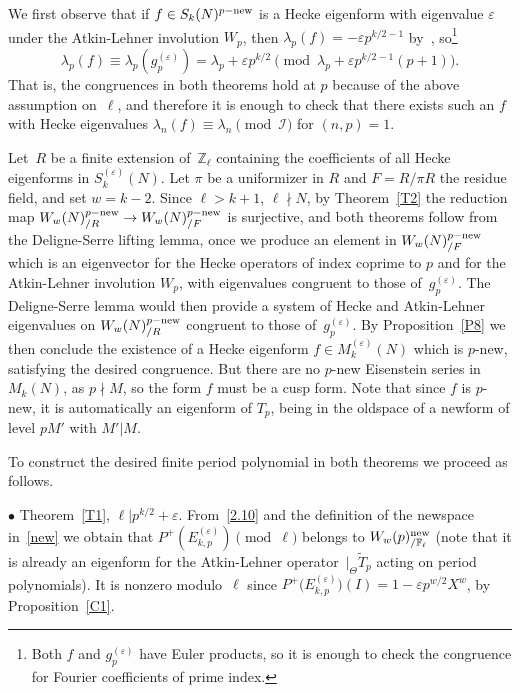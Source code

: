 \documentclass{amsart}
\theoremstyle{plain}
\theoremstyle{definition}
\numberwithin{equation}{section}
\newcommand{\Z}{{\mathbb Z}}
\def\I{\mathcal{I}} \def\J{\mathcal{J}} \def\LL{\mathcal{L}}
\def\e{\varepsilon} \def\DD{\Delta} \def\G{\Gamma}\def\om{\omega}
\newcommand{\wT}{\widetilde{T}}
\def\rar{\rightarrow}\def\FF{\mathbb{F}}
\begin{document}
We first observe that if $f\in S_k(N)^{p-\mathrm{new}}$ is a Hecke eigenform with 
 eigenvalue $\e$ under the Atkin-Lehner involution $W_p$, then $\lambda_{p}(f)=-\e p^{k/2-1}$ by~\cite[Thm. 3]{AL}, 
so\footnote{Both  $f$ and  $g_p^{(\e)}$  have Euler products,  so it is enough to check
the congruence for Fourier coefficients of prime index.}
 \[\lambda_{p}(f)\equiv \lambda_{p}(g_p^{(\e)})=\lambda_{p}+\e p^{k/2}
\pmod{ \lambda_p+  \e p^{k/2-1}(p+1)  }.
\]
That is, the congruences in both theorems hold at $p$ because of the above assumption on~$\ell$,
and therefore it is enough to check that there exists such an $f$ with Hecke eigenvalues 
 $\lambda_n(f)\equiv \lambda_n\pmod \I$ for $(n ,p)=1$.
   


Let~$R$ be a finite extension of~$\Z_\ell$ containing the coefficients of 
all Hecke eigenforms in $S_k^{(\e)}(N)$.  Let $\pi$ be a uniformizer in $R$
and $F=R/\pi R$ the residue field, and set $w=k-2$. Since $\ell>k+1$, $\ell\nmid N$, 
by Theorem~\ref{T2} the reduction map 
$ W_w(N)_{/R}^{p-\new}\rar W_w(N)_{/ F}^{p-\new} $
is surjective, and both theorems follow from the Deligne-Serre lifting lemma, once
we produce an element in $W_w(N)_{/ F}^{p-\mathrm{new}}$ which is an eigenvector for the Hecke 
operators of index coprime to $p$ and for the Atkin-Lehner involution $W_p$, 
with eigenvalues congruent to those of~$g_p^{(\e)}$.  
The Deligne-Serre lemma would then provide a system of  Hecke and Atkin-Lehner 
eigenvalues on $W_w(N)_{/R}^{p-\mathrm{new}}$ congruent to those of~$g_p^{(\e)}$. 
By Proposition~\ref{P8} we then conclude the existence of a Hecke eigenform 
$f\in M_k^{(\e)}(N)$ which is $p$-new, satisfying the desired congruence. 
But there are no $p$-new Eisenstein series in $M_k(N)$, as $p\nmid M$, 
so the form $f$ must be a cusp form.   Note that since $f$ is $p$-new, 
it is automatically an eigenform of $T_p$, being in the oldspace of a newform  
of level $pM'$ with $M'|M$.

To construct the desired finite period polynomial in both theorems we proceed as 
follows. 

$\bullet$ Theorem~\ref{T1}, $\ell|p^{k/2}+\e$. From~\eqref{2.10} and the definition of 
the newspace in~\eqref{new} we obtain that $P^+(E_{k,p}^{(\e)}) \pmod \ell$ belongs  to
$W_{w}(p)^\new_{/ \FF_\ell}$ (note that it is already an eigenform for the 
Atkin-Lehner operator~$|_\Theta \wT_p$ acting on period polynomials). It is nonzero 
modulo~$\ell$ since
$P^+\big(E_{k,p}^{(\e)}\big)(I)=1-\e p^{w/2}X^w$, by Proposition~\ref{C1}. 
\end{document}

